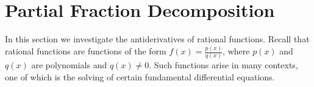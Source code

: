 
%
%



\section{Partial Fraction Decomposition}\label{sec:partial_fraction}

In this section we investigate the antiderivatives of rational functions. Recall that rational functions are functions of the form $f(x)= \frac{p(x)}{q(x)}$, where $p(x)$ and $q(x)$ are polynomials and $q(x)\neq 0$. Such functions arise in many contexts, one of which is the solving of certain fundamental differential equations.

